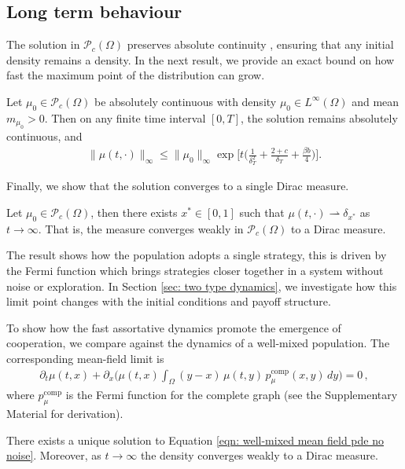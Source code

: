 \documentclass[10pt]{article}
\begin{document}
\subsection{Long term behaviour}
The solution in $\mathcal{P}_c(\Omega)$ preserves absolute continuity \cite{Bonnet2017ThePM}, ensuring that any initial density remains a density. In the next result, we provide an exact bound on how fast the maximum point of the distribution can grow.
\begin{proposition}\label{prop: no noise solution maximum bound}
    Let $\mu_0 \in \mathcal{P}_c(\Omega)$ be absolutely continuous with density $\mu_0 \in L^\infty(\Omega)$ and mean $m_{\mu_0} >0$. Then on any finite time interval $[0,T]$, the solution remains absolutely continuous, and
    \begin{align*}
        \|\mu(t,\cdot)\|_\infty \leq \|\mu_0\|_\infty \exp\bigg[t\Big(\frac{1}{\delta_T^2} + \frac{2+c}{\delta_T} + \frac{\beta b}{4}\Big)\bigg]. 
    \end{align*}
\end{proposition}
Finally, we show that the solution converges to a single Dirac measure. 
\begin{theorem}\label{thm: convergence of measure to a dirac}
    Let $\mu_0 \in \mathcal{P}_c(\Omega)$, then there exists $x^* \in [0,1]$ such that $\mu(t,\cdot) \rightharpoonup \delta_{x^*}$ as $t \rightarrow \infty$. That is, the measure converges weakly in $\mathcal{P}_c (\Omega)$ to a Dirac measure.
\end{theorem}
The result shows how the population adopts a single strategy, this is driven by the Fermi function which brings strategies closer together in a system without noise or exploration. In Section \ref{sec: two type dynamics}, we investigate how this limit point changes with the initial conditions and payoff structure.

To show how the fast assortative dynamics promote the emergence of cooperation, we compare against the dynamics of a well-mixed population. The corresponding mean-field limit is
\begin{align}\label{eqn: well-mixed mean field pde no noise}
    \partial_t\mu(t,x) +\partial_x\bigg( \mu(t,x)\int_{\Omega} (y-x)\,\mu(t,y)\,p^{\text{comp}}_\mu(x,y)\,dy\bigg) = 0 \,,
\end{align}
where $p^{\text{comp}}_\mu$ is the Fermi function for the complete graph (see the Supplementary Material for derivation).

\begin{proposition}\label{prop: unique solution for complete network}
    There exists a unique solution to Equation \eqref{eqn: well-mixed mean field pde no noise}. Moreover, as $t \rightarrow \infty$ the density converges weakly to a Dirac measure.
\end{proposition}
\end{document}
